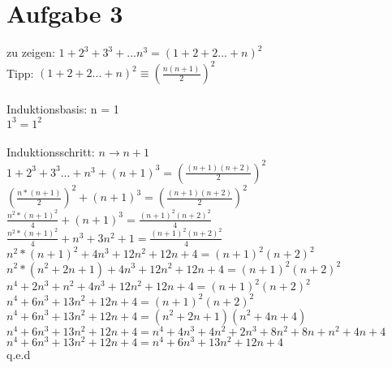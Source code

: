 \documentclass{article}
\begin{document}
	\section*{Aufgabe 3}
	zu zeigen: $1 +2^3 + 3^3 + ... n^3 = (1 + 2 + 2 ... + n)^2$ \\
	Tipp: $(1 + 2 + 2 ... + n)^2 \equiv (\frac{n(n+1)}{2})^2$ \\ \\
	Induktionsbasis: n = 1\\
	$1^3 = 1^2$ \\ \\
	Induktionsschritt: $n \to n+1$ \\
	$1 + 2^3 + 3^3 ... + n^3 + (n+1)^3 =  (\frac{(n+1)(n+2)}{2})^2$ \\
	$(\frac{n*(n+1)}{2})^2 + (n+1)^3 =  (\frac{(n+1)(n+2)}{2})^2$ \\
	$\frac{n^2*(n+1)^2}{4} + (n+1)^3 = \frac{(n+1)^2(n+2)^2}{4}$ \\
	$\frac{n^2*(n+1)^2}{4} + n^3 + 3n^2 + 1 = \frac{(n+1)^2(n+2)^2}{4}$ \\
	$n^2*(n+1)^2 + 4n^3 + 12n^2 + 12n + 4 = (n+1)^2(n+2)^2$ \\
	$n^2*(n^2 + 2n +1) + 4n^3 + 12n^2 + 12n + 4 = (n+1)^2(n+2)^2$ \\
	$n^4 + 2n^3 + n^2 + 4n^3 + 12n^2 + 12n + 4 = (n+1)^2(n+2)^2$ \\
	$n^4 + 6n^3 + 13n^2 + 12n + 4 = (n+1)^2(n+2)^2$ \\
	$n^4 + 6n^3 + 13n^2 + 12n + 4 = (n^2 + 2n + 1)(n^2 + 4n + 4)$ \\
	$n^4 + 6n^3 + 13n^2 + 12n + 4 = n^4 + 4n^3 + 4n^2 + 2n^3 + 8n^2 +8n + n^2 + 4n + 4$ \\
	$n^4 + 6n^3 + 13n^2 + 12n + 4 = n^4 + 6n^3 + 13n^2  +12n + 4$ \\
	q.e.d
\end{document}

